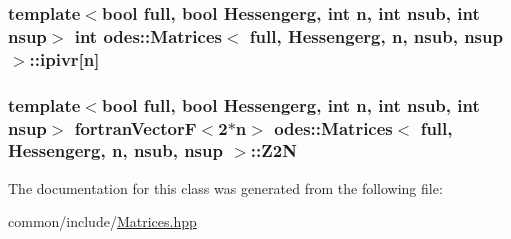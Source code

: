 \hypertarget{classodes_1_1Matrices_ac7c747721a0d2ca7f9b792f25ce07ea9}{
\subsubsection[{ipivr}]{\setlength{\rightskip}{0pt plus 5cm}template$<$bool full, bool Hessengerg, int n, int nsub, int nsup$>$ int {\bf odes\-::\-Matrices}$<$ full, Hessengerg, n, nsub, nsup $>$\-::ipivr\mbox{[}n\mbox{]}\hspace{0.3cm}{\ttfamily [private]}}}\label{classodes_1_1Matrices_ac7c747721a0d2ca7f9b792f25ce07ea9}
\hypertarget{classodes_1_1Matrices_a812f56a1f3582a4c25271306644606f0}{
\subsubsection[{Z2\-N}]{\setlength{\rightskip}{0pt plus 5cm}template$<$bool full, bool Hessengerg, int n, int nsub, int nsup$>$ {\bf fortran\-Vector\-F}$<$2$\ast$n$>$ {\bf odes\-::\-Matrices}$<$ full, Hessengerg, n, nsub, nsup $>$\-::Z2\-N\hspace{0.3cm}{\ttfamily [private]}}}\label{classodes_1_1Matrices_a812f56a1f3582a4c25271306644606f0}


The documentation for this class was generated from the following file\-:\begin{DoxyCompactItemize}
\item 
common/include/\hyperlink{Matrices_8hpp}{Matrices.\-hpp}\end{DoxyCompactItemize}
